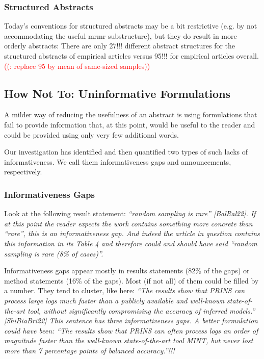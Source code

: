 \documentclass[10pt,journal,compsoc]{IEEEtran}
\newcommand{\Art}[1]{\bgroup[#1]\egroup} %
\newcounter{todonumber}
\newcommand{\Todo}[1]{\stepcounter{todonumber}\textcolor{red}{\sffamily ((\arabic{todonumber}: #1))}}
\newcommand{\Quote}[1]{\bgroup\itshape ``#1''\egroup}  %
\newcommand{\Pseudoquote}[1]{\bgroup\itshape ``#1''\egroup}  %
\begin{document}
\subsubsection{Structured Abstracts}

Today's conventions for structured abstracts may be a bit restrictive
(e.g. by not accommodating the useful mrmr substructure),
but they do result in more orderly abstracts:
There are only 27!!! different abstract structures for the structured abstracts of empirical articles
versus 95!!! for empirical articles overall.
\Todo{replace 95 by mean of same-sized samples}


\subsection{How Not To: Uninformative Formulations}

A milder way of reducing the usefulness of an abstract is using formulations that
fail to provide information that, at this point, would be useful to the reader and
could be provided using only very few additional words.

Our investigation has identified and then quantified two types
of such lacks of informativeness.
We call them informativeness gaps and announcements, respectively.

\subsubsection{Informativeness Gaps}\label{igaps}

Look at the following result statement:
\Quote{random sampling is rare} \Art{BalRal22}. %
If at this point the reader expects the work contains something more
concrete than \Quote{rare}, this is an informativeness gap.
And indeed the article in question contains this information in its
Table 4 and therefore could and should have said
\Pseudoquote{random sampling is rare (8\% of cases)}.

Informativeness gaps appear mostly in results statements (82\% of the gaps)
or method statements (16\% of the gaps).
Most (if not all) of them could be filled by a number.
They tend to cluster,
like here:
\Quote{The results show that PRINS can process large logs much faster
  than a publicly available and well-known state-of-the-art tool,
  without significantly compromising the accuracy of inferred models.} \Art{ShiBiaBri22} %
This sentence has three informativeness gaps.
A better formulation could have been:
\Pseudoquote{The results show that PRINS can often process logs an order of magnitude faster
  than the well-known state-of-the-art tool MINT,
  but never lost more than 7 percentage points of balanced accuracy.}!!!
\end{document}
